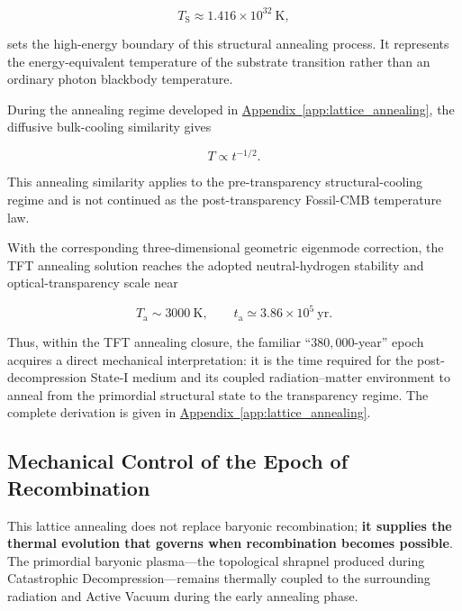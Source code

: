 \begin{equation}
    T_{\mathrm S}
    \approx
    1.416 \times 10^{32}\ \mathrm{K},
\end{equation}

sets the high-energy boundary of this structural annealing process. It represents the energy-equivalent temperature of the substrate transition rather than an ordinary photon blackbody temperature.

During the annealing regime developed in \hyperref[app:lattice_annealing]{Appendix~\ref*{app:lattice_annealing}}, the diffusive bulk-cooling similarity gives

\begin{equation}
    T \propto t^{-1/2}.
\end{equation}

This annealing similarity applies to the pre-transparency structural-cooling regime and is not continued as the post-transparency Fossil-CMB temperature law.

With the corresponding three-dimensional geometric eigenmode correction, the TFT annealing solution reaches the adopted neutral-hydrogen stability and optical-transparency scale near

\begin{equation}
    T_{\mathrm a}
    \sim
    3000\ \mathrm{K},
    \qquad
    t_{\mathrm a}
    \simeq
    3.86 \times 10^5\ \mathrm{yr}.
\end{equation}

Thus, within the TFT annealing closure, the familiar ``\(380{,}000\)-year'' epoch acquires a direct mechanical interpretation: it is the time required for the post-decompression State-I medium and its coupled radiation--matter environment to anneal from the primordial structural state to the transparency regime. The complete derivation is given in \hyperref[app:lattice_annealing]{Appendix~\ref*{app:lattice_annealing}}.

\subsection*{Mechanical Control of the Epoch of Recombination}

This lattice annealing does not replace baryonic recombination; \textbf{it supplies the thermal evolution that governs when recombination becomes possible}. The primordial baryonic plasma---the topological shrapnel produced during Catastrophic Decompression---remains thermally coupled to the surrounding radiation and Active Vacuum during the early annealing phase.

